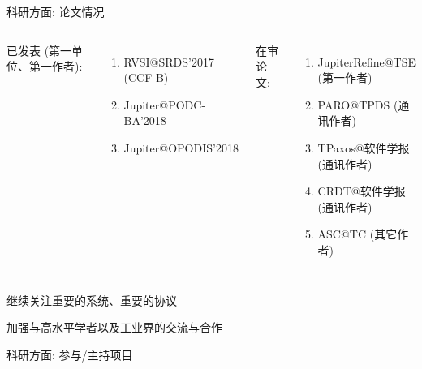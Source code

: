 
\begin{frame}{科研方面: 论文情况}
  \begin{columns}
      已发表 (第一单位、第一作者):
      \begin{enumerate}
	\setlength{\itemsep}{5pt}
	\item RVSI@SRDS'2017 \\ (CCF B)
	\item Jupiter@PODC-BA'2018
	\item Jupiter@OPODIS'2018
      \end{enumerate}
      在审论文:
      \begin{enumerate}
	\setlength{\itemsep}{5pt}
	\item JupiterRefine@TSE (第一作者)
	\item PARO@TPDS (通讯作者)
	\item TPaxos@软件学报 (通讯作者)
	\item CRDT@软件学报 (通讯作者)
	\item ASC@TC (其它作者)
      \end{enumerate}
  \end{columns}

  \begin{center}
    \item 继续关注重要的系统、重要的协议 \\[5pt]
    \item 加强与高水平学者以及工业界的交流与合作
  \end{center}
\end{frame}

\begin{frame}{科研方面: 参与/主持项目}
  \begin{table}[]
    \centering
    \renewcommand{\arraystretch}{1.2}
  \end{table}
\end{frame}

